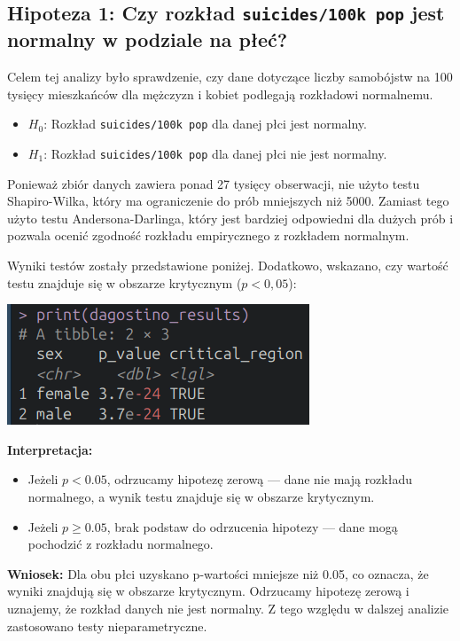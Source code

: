 \documentclass[polish]{article}
\begin{document}
    \subsection{Hipoteza 1: Czy rozkład \texttt{suicides/100k pop} jest normalny w podziale na płeć?}

    Celem tej analizy było sprawdzenie, czy dane dotyczące liczby samobójstw na 100 tysięcy mieszkańców dla mężczyzn i kobiet podlegają rozkładowi normalnemu.

    \begin{itemize}
        \item \( H_0 \): Rozkład \texttt{suicides/100k pop} dla danej płci jest normalny.
        \item \( H_1 \): Rozkład \texttt{suicides/100k pop} dla danej płci nie jest normalny.
    \end{itemize}

    Ponieważ zbiór danych zawiera ponad 27 tysięcy obserwacji, nie użyto testu Shapiro-Wilka, który ma ograniczenie do prób mniejszych niż 5000. Zamiast tego użyto testu Andersona-Darlinga, który jest bardziej odpowiedni dla dużych prób i pozwala ocenić zgodność rozkładu empirycznego z rozkładem normalnym.

    Wyniki testów zostały przedstawione poniżej. Dodatkowo, wskazano, czy wartość testu znajduje się w obszarze krytycznym (\( p < 0{,}05 \)):

    \begin{center}
        \includegraphics{img/hipoteza1.png}
    \end{center}

    \textbf{Interpretacja:}
    \begin{itemize}
        \item Jeżeli \( p < 0.05 \), odrzucamy hipotezę zerową — dane nie mają rozkładu normalnego, a wynik testu znajduje się w obszarze krytycznym.
        \item Jeżeli \( p \geq 0.05 \), brak podstaw do odrzucenia hipotezy — dane mogą pochodzić z rozkładu normalnego.
    \end{itemize}

    \textbf{Wniosek:} Dla obu płci uzyskano p-wartości mniejsze niż 0.05, co oznacza, że wyniki znajdują się w obszarze krytycznym. Odrzucamy hipotezę zerową i uznajemy, że rozkład danych nie jest normalny. Z tego względu w dalszej analizie zastosowano testy nieparametryczne.
\end{document}
